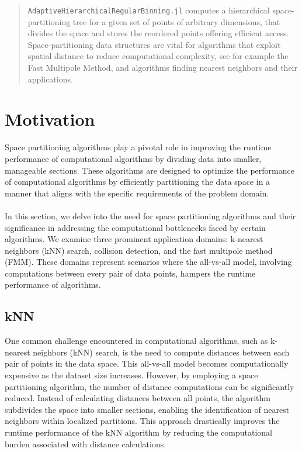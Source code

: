 \documentclass{juliacon}
\begin{document}


\maketitle

\begin{abstract}

\verb|AdaptiveHierarchicalRegularBinning.jl| computes a hierarchical space-partitioning
tree for a given set of points of arbitrary dimensions, that divides the space and
stores the reordered points offering efficient access. Space-partitioning data
structures are vital for algorithms that exploit spatial distance to reduce
computational complexity, see for example the Fast Multipole Method, and algorithms
finding nearest neighbors and their applications.

\end{abstract}


\section{Motivation}
Space partitioning algorithms play a pivotal role in improving the runtime
performance of computational algorithms by dividing data into smaller,
manageable sections. These algorithms are designed to optimize the performance
of computational algorithms by efficiently partitioning the data space in a
manner that aligns with the specific requirements of the problem domain.
\\\\
In this section, we delve into the need for space partitioning
algorithms and their significance in addressing the computational bottlenecks
faced by certain algorithms. We examine three prominent application domains:
k-nearest neighbors (kNN) search, collision detection, and the fast multipole
method (FMM). These domains represent scenarios where the all-vs-all model,
involving computations between every pair of data points, hampers the runtime
performance of algorithms.

\subsection{kNN}
One common challenge encountered in computational algorithms, such as k-nearest
neighbors (kNN) search, is the need to compute distances between each pair of
points in the data space. This all-vs-all model becomes computationally
expensive as the dataset size increases. However, by employing a space
partitioning algorithm, the number of distance computations can be
significantly reduced. Instead of calculating distances between all points,
the algorithm subdivides the space into smaller sections, enabling the
identification of nearest neighbors within localized partitions. This approach
drastically improves the runtime performance of the kNN algorithm by reducing
the computational burden associated with distance calculations.
\end{document}
